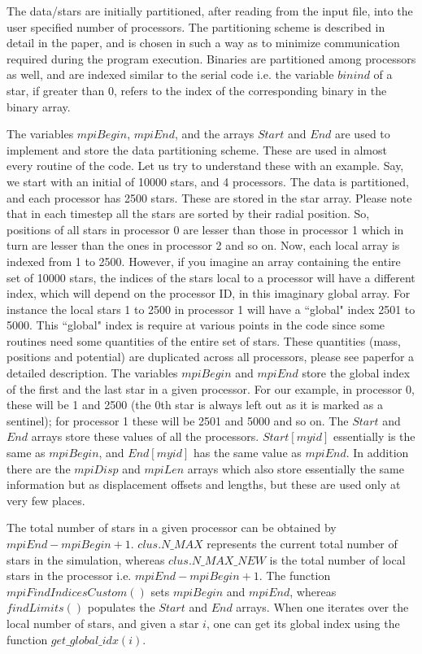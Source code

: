 \documentclass[11pt]{article}
\begin{document}
The data/stars are initially partitioned, after reading from the input file, into the user specified number of processors. The partitioning scheme is described in detail in the paper, and is chosen in such a way as to minimize communication required during the program execution. Binaries are partitioned among processors as well, and are indexed similar to the serial code i.e. the variable $binind$ of a star, if greater than 0, refers to the index of the corresponding binary in the binary array.

The variables $mpiBegin$, $mpiEnd$, and the arrays $Start$ and $End$ are used to implement and store the data partitioning scheme. These are used in almost every routine of the code. Let us try to understand these with an example. Say, we start with an initial of 10000 stars, and 4 processors. The data is partitioned, and each processor has 2500 stars. These are stored in the star array. Please note that in each timestep all the stars are sorted by their radial position. So, positions of all stars in processor 0 are lesser than those in processor 1 which in turn are lesser than the ones in processor 2 and so on. Now, each local array is indexed from 1 to 2500. However, if you imagine an array containing the entire set of 10000 stars, the indices of the stars local to a processor will have a different index, which will depend on the processor ID, in this imaginary global array. For instance the local stars 1 to 2500 in processor 1 will have a ``global" index 2501 to 5000. This ``global" index is require at various points in the code since some routines need some quantities of the entire set of stars. These quantities (mass, positions and potential) are duplicated across all processors, please see paper\footnotemark[\value{footnote}] for a detailed description. The variables $mpiBegin$ and $mpiEnd$ store the global index of the first and the last star in a given processor. For our example, in processor 0, these will be 1 and 2500 (the 0th star is always left out as it is marked as a sentinel); for processor 1 these will be 2501 and 5000 and so on. The $Start$ and $End$ arrays store these values of all the processors. $Start[myid]$ essentially is the same as $mpiBegin$, and $End[myid]$ has the same value as $mpiEnd$. In addition there are the $mpiDisp$ and $mpiLen$ arrays which also store essentially the same information but as displacement offsets and lengths, but these are used only at very few places.

The total number of stars in a given processor can be obtained by $mpiEnd-mpiBegin+1$. $clus.N\_MAX$ represents the current total number of stars in the simulation, whereas $clus.N\_MAX\_NEW$ is the total number of local stars in the processor i.e. $mpiEnd-mpiBegin+1$. The function $mpiFindIndicesCustom()$ sets $mpiBegin$ and $mpiEnd$, whereas $findLimits()$ populates the $Start$ and $End$ arrays. When one iterates over the local number of stars, and given a star $i$, one can get its global index using the function $get\_global\_idx(i)$.
\end{document}
